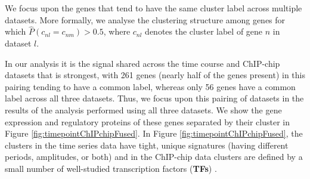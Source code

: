 \documentclass{bmcart}
\begin{document}
We focus upon the genes that tend to have the same cluster label across multiple datasets. More formally, we analyse the clustering structure among genes for which $\hat{P}(c_{nl} = c_{nm}) > 0.5$, where $c_{nl}$ denotes the cluster label of gene $n$ in dataset $l$.

In our analysis it is the signal shared across the time course and ChIP-chip datasets that is strongest, with 261 genes (nearly half of the genes present) in this pairing tending to have a common label, whereas only 56 genes have a common label across all three datasets. Thus, we focus upon this pairing of datasets in the results of the analysis performed using all three datasets. 
We show the gene expression and regulatory proteins of these genes separated by their cluster in Figure \ref{fig:timepointChIPchipFused}. In Figure \ref{fig:timepointChIPchipFused}, the clusters in the time series data have tight, unique signatures  (having different periods, amplitudes, or both) and in the ChIP-chip data clusters are defined by a small number of well-studied transcription factors (\textbf{TFs}) \citep[see Table 2 of the Supplementary Material for details of these TFs, many of which are well known to regulate cell cycle expression,][]{simon2001serial}.
\end{document}
